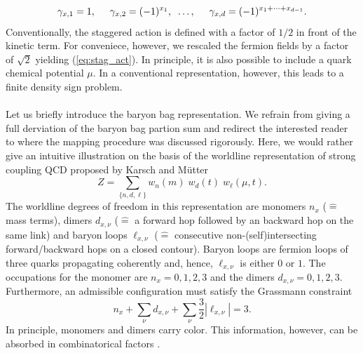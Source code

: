 \documentclass{PoS}
\begin{document}
\begin{equation}
\gamma_{x, 1} = 1, \hspace*{0.5cm}\gamma_{x, 2} = (-1)^{x_1},\;\; \dots, \hspace*{0.5cm}\gamma_{x, d} = (-1)^{x_1 + \dots + x_{d-1}}.
\end{equation}
Conventionally, the staggered action is defined with a factor of $1/2$ in front of the kinetic term. For conveniece, however, we rescaled the fermion fields by a factor of $\sqrt{2}$ yielding (\ref{eq:stag_act}). In principle, it is also possible to include a quark chemical potential $\mu$. In a conventional representation, however, this leads to a finite density sign problem.\\
\\
Let us briefly introduce the baryon bag representation. We refrain from giving a full derviation of the baryon bag partion sum and redirect the interested reader to \cite{Gattringer:2018mrg} where the mapping procedure was discussed rigorously. Here, we would rather give an intuitive illustration on the basis of the worldline representation of strong coupling QCD proposed by Karsch and M\"utter \cite{Karsch:1988zx}
\begin{equation}
Z = \sum_{\{n, d, \ell\}} w_n(m) \; w_d(t) \; w_{\ell}(\mu,t).
\end{equation}
The worldline degrees of freedom in this representation are monomers $n_x$ ($\hat{=}$ mass terms), dimers $d_{x,\nu}$ ($\hat{=}$ a forward hop followed by an backward hop on the same link) and baryon loops $\ell_{x,\nu}$ ($\hat{=}$ consecutive non-(self)intersecting forward/backward hops on a closed contour). Baryon loops are fermion loops of three quarks propagating coherently and, hence, $\ell_{x,\nu}$ is either $0$ or $1$. The occupations for the monomer are $n_x = 0,1,2,3$ and the dimers $d_{x,\nu} = 0,1,2,3$. Furthermore, an admissible configuration must satisfy the Grassmann constraint
\begin{equation}
n_x + \sum_{\nu} d_{x,\nu} + \sum_{\nu} \frac{3}{2} |\ell_{x,\nu}| = 3.
\label{eq:GM_const}
\end{equation}
In principle, monomers and dimers carry color. This information, however, can be absorbed in combinatorical factors \cite{Rossi:1984cv, Karsch:1988zx, Marchis:2018tcs}.\\
\\
\end{document}
